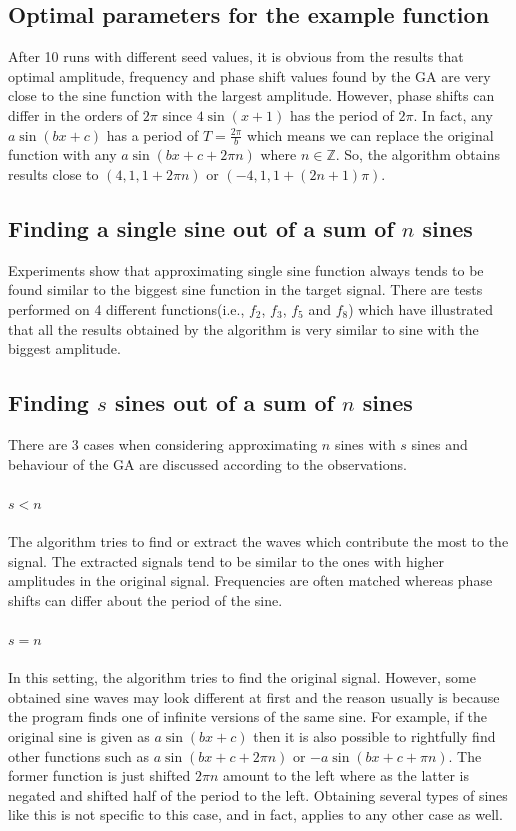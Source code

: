 \documentclass[conference]{IEEEtran}
\begin{document}
\subsection{Optimal parameters for the example function}
After 10 runs with different seed values, it is obvious from the results that optimal amplitude, frequency and phase shift values found by the GA are very close to the sine function with the largest amplitude. 
However, phase shifts can differ in the orders of $2\pi$ since $4\sin(x+1)$ has the period of $2\pi$. In fact, any $a\sin(bx+c)$ has a period of $T=\frac{2\pi}{b}$ which means we can replace the original function 
with any $a\sin(bx+c+2\pi n)$ where $n\in\mathbb{Z}$. So, the algorithm obtains results close to $(4, 1, 1+2\pi n)$ or $(-4, 1, 1+(2n+1)\pi)$.

\subsection{Finding a single sine out of a sum of $n$ sines}
Experiments show that approximating single sine function always tends to be found similar to the biggest sine function in the target signal. There are tests performed on 4 different 
functions(i.e., $f_2$, $f_3$, $f_5$ and $f_8$) which have illustrated that all the results obtained by the algorithm is very similar to sine with the biggest amplitude.

\subsection{Finding $s$ sines out of a sum of $n$ sines}
There are 3 cases when considering approximating $n$ sines with $s$ sines and behaviour of the GA are discussed according to the observations.

\paragraph{$s<n$}
The algorithm tries to find or extract the waves which contribute the most to the signal. The extracted signals tend to be similar to the ones with higher amplitudes in the original signal. Frequencies are 
often matched whereas phase shifts can differ about the period of the sine.

\paragraph{$s=n$}
In this setting, the algorithm tries to find the original signal. However, some obtained sine waves may look different at first and the reason usually is because the program finds one of infinite versions of 
the same sine. For example, if the original sine is given as $a\sin(bx+c)$ then it is also possible to rightfully find other functions such as $a\sin(bx+c+2\pi n)$ or $-a\sin(bx+c+\pi n)$. The former function 
is just shifted $2\pi n$ amount to the left where as the latter is negated and shifted half of the period to the left. Obtaining several types of sines like this is not specific to this case, and in fact, 
applies to any other case as well.
\end{document}
